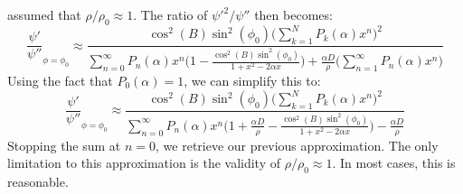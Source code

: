             assumed that $\rho/\rho_{0}\approx{1}$. The ratio of
            $\psi'^{2}/\psi''$ then becomes:
            \begin{equation*}
                \frac{\psi'}{\psi''}_{\phi=\phi_{0}}\approx
                \frac{\cos^{2}(B)\sin^{2}(\phi_{0})
                      \Big(\sum_{k=1}^{N}P_{k}(\alpha)x^{n}\Big)^{2}}
                     {\sum_{n=0}^{\infty}P_{n}(\alpha)x^{n}
                      \Big(1-\frac{\cos^{2}(B)\sin^{2}(\phi_{0})}
                                  {1+x^{2}-2\alpha{x}}\Big)+
                      \frac{\alpha{D}}{\rho}
                      \Big(\sum_{n=1}^{\infty}P_{n}(\alpha)x^{n}\Big)}
            \end{equation*}
            Using the fact that $P_{0}(\alpha)=1$, we can simplify
            this to:
            \begin{equation*}
                \frac{\psi'}{\psi''}_{\phi=\phi_{0}}\approx
                \frac{\cos^{2}(B)\sin^{2}(\phi_{0})
                      \Big(\sum_{k=1}^{N}P_{k}(\alpha)x^{n}\Big)^{2}}
                     {\sum_{n=0}^{\infty}P_{n}(\alpha)x^{n}
                      \Big(1+\frac{\alpha{D}}{\rho}-
                           \frac{\cos^{2}(B)\sin^{2}(\phi_{0})}
                                {1+x^{2}-2\alpha{x}}\Big)-
                      \frac{\alpha{D}}{\rho}}
            \end{equation*}
            Stopping the sum at $n=0$, we retrieve our previous
            approximation. The only limitation to this approximation
            is the validity of $\rho/\rho_{0}\approx{1}$. In
            most cases, this is reasonable.

